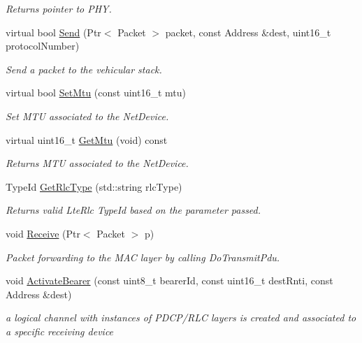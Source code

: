\begin{DoxyCompactItemize}
\begin{DoxyCompactList}\small\item\em Returns pointer to P\+HY. \end{DoxyCompactList}\item 
virtual bool \hyperlink{classns3_1_1millicar_1_1MmWaveVehicularNetDevice_a60c5982f9d3aeab8de2dfdfaec142a2f}{Send} (Ptr$<$ Packet $>$ packet, const Address \&dest, uint16\+\_\+t protocol\+Number)
\begin{DoxyCompactList}\small\item\em Send a packet to the vehicular stack. \end{DoxyCompactList}\item 
virtual bool \hyperlink{classns3_1_1millicar_1_1MmWaveVehicularNetDevice_a5e381e54c479300f0f4180227d810bae}{Set\+Mtu} (const uint16\+\_\+t mtu)
\begin{DoxyCompactList}\small\item\em Set M\+TU associated to the Net\+Device. \end{DoxyCompactList}\item 
\mbox{\label{classns3_1_1millicar_1_1MmWaveVehicularNetDevice_a706437862864c4c34c6b2beb88b3b307}} 
virtual uint16\+\_\+t \hyperlink{classns3_1_1millicar_1_1MmWaveVehicularNetDevice_a706437862864c4c34c6b2beb88b3b307}{Get\+Mtu} (void) const
\begin{DoxyCompactList}\small\item\em Returns M\+TU associated to the Net\+Device. \end{DoxyCompactList}\item 
Type\+Id \hyperlink{classns3_1_1millicar_1_1MmWaveVehicularNetDevice_a203a3fd59d76d45088f1921aff413549}{Get\+Rlc\+Type} (std\+::string rlc\+Type)
\begin{DoxyCompactList}\small\item\em Returns valid Lte\+Rlc Type\+Id based on the parameter passed. \end{DoxyCompactList}\item 
void \hyperlink{classns3_1_1millicar_1_1MmWaveVehicularNetDevice_a039f27547bec8a9eeea418b47241a578}{Receive} (Ptr$<$ Packet $>$ p)
\begin{DoxyCompactList}\small\item\em Packet forwarding to the M\+AC layer by calling Do\+Transmit\+Pdu. \end{DoxyCompactList}\item 
void \hyperlink{classns3_1_1millicar_1_1MmWaveVehicularNetDevice_a9a94cdd2a634545069bc76a25e48d5e7}{Activate\+Bearer} (const uint8\+\_\+t bearer\+Id, const uint16\+\_\+t dest\+Rnti, const Address \&dest)
\begin{DoxyCompactList}\small\item\em a logical channel with instances of P\+D\+C\+P/\+R\+LC layers is created and associated to a specific receiving device \end{DoxyCompactList}\end{DoxyCompactItemize}
